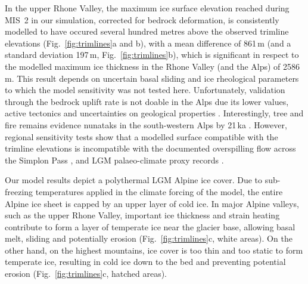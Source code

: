 \documentclass[tc, manuscript]{copernicus}
\begin{document}
    In the upper Rhone Valley, the maximum ice surface elevation reached
    during MIS~2 in our simulation, corrected for bedrock deformation, is
    consistently modelled to have occured several hundred metres above the
    observed trimline elevations (Fig.~\ref{fig:trimlines}a and b), with a mean
    difference of 861\,m (and a standard deviation 197\,m,
    Fig.~\ref{fig:trimlines}b), which is significant in respect to the modelled
    maximum ice thickness in the Rhone Valley (and the Alps) of 2586\,m. This
    result depends on uncertain basal sliding and ice rheological parameters
    to which the model sensitivity was not tested here. Unfortunately,
    validation through the bedrock uplift rate \citep[cf.][]{Kuchar.etal.2012}
    is not doable in the Alps due its lower values, active tectonics and
    uncertainties on geological properties \citep[cf.][]{Mey.etal.2016}.
    Interestingly, tree and fire remains evidence nunataks in the south-western
    Alps by 21\,ka \citep{Carcaillet.Blarquez.2017, Carcaillet.etal.2018}.
    However, regional sensitivity tests show that a modelled surface compatible
    with the trimline elevations is incompatible with the documented
    overspilling flow across the Simplon Pass \citep{Becker.etal.2017}, and LGM
    palaeo-climate proxy records \citep{Cohen.etal.2017}.

    Our model results depict a polythermal LGM Alpine ice cover.
    Due to sub-freezing temperatures applied in the climate forcing of the
    model, the entire Alpine ice sheet is capped by an upper layer of cold ice.
    In major Alpine valleys, such as the upper Rhone Valley, important ice
    thickness and strain heating contribute to form a layer of temperate ice
    near the glacier base, allowing basal melt, sliding and potentially
    erosion (Fig.~\ref{fig:trimlines}c, white areas). On the other hand, on the
    highest mountains, ice cover is too thin and too static to form temperate
    ice, resulting in cold ice down to the bed and preventing potential erosion
    (Fig.~\ref{fig:trimlines}c, hatched areas).
\end{document}
